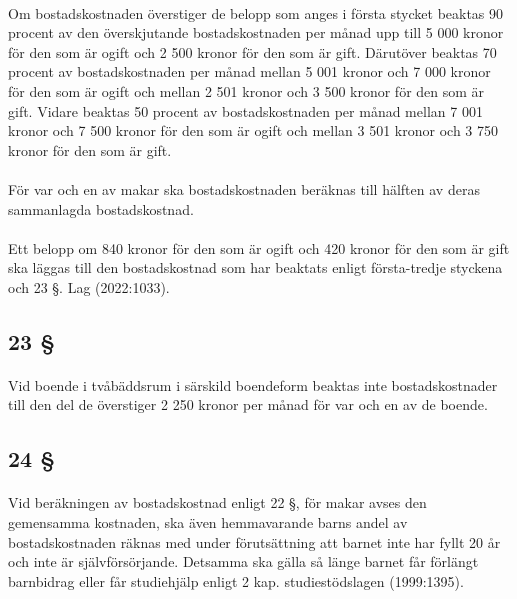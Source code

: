 \documentclass[a4paper,notitlepage,openany,10pt]{book}
\begin{document}
\paragraph*{}
Om bostadskostnaden överstiger de belopp som anges i första stycket beaktas 90 procent av den överskjutande bostadskostnaden per månad upp till 5 000 kronor för den som är ogift och 2 500 kronor för den som är gift. Därutöver beaktas 70 procent av bostadskostnaden per månad mellan 5 001 kronor och 7 000 kronor för den som är ogift och mellan 2 501 kronor och 3 500 kronor för den som är gift. Vidare beaktas 50 procent av bostadskostnaden per månad mellan 7 001 kronor och 7 500 kronor för den som är ogift och mellan 3 501 kronor och 3 750 kronor för den som är gift.
\paragraph*{}
För var och en av makar ska bostadskostnaden beräknas till hälften av deras sammanlagda bostadskostnad.
\paragraph*{}
Ett belopp om 840 kronor för den som är ogift och 420 kronor för den som är gift ska läggas till den bostadskostnad som har beaktats enligt första-tredje styckena och 23 §.
Lag (2022:1033).
\subsection*{23 §}
\paragraph*{}
Vid boende i tvåbäddsrum i särskild boendeform beaktas inte bostadskostnader till den del de överstiger 2 250 kronor per månad för var och en av de boende.
\subsection*{24 §}
\paragraph*{}
Vid beräkningen av bostadskostnad enligt 22 §, för makar avses den gemensamma kostnaden, ska även hemmavarande barns andel av bostadskostnaden räknas med under förutsättning att barnet inte har fyllt 20 år och inte är självförsörjande.
Detsamma ska gälla så länge barnet får förlängt barnbidrag eller får studiehjälp enligt 2 kap. studiestödslagen (1999:1395).
\end{document}
